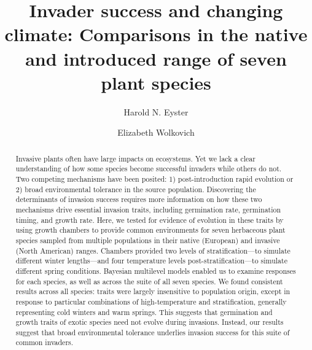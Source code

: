 \documentclass[12pt]{article}\usepackage[]{graphicx}\usepackage[]{color}
\title{Invader success and changing climate: Comparisons in the native and introduced range of seven plant species}
\author[1]{Harold N. Eyster}
\author[2]{Elizabeth Wolkovich}
\affil[1]{Institute for Resources, Environment, and Sustainability, University of British Columbia}
\affil[2]{Department of Forest and Conservation Science, University of British Columbia}
\date{}                     %
\begin{document}
\maketitle

\begin{spacing}{1} %
	\begin{abstract} 
Invasive plants often have large impacts on ecosystems. Yet we lack a clear understanding of how some species become successful invaders while others do not. Two competing mechanisms have been posited: 1) post-introduction rapid evolution or 2) broad environmental tolerance in the source population. 
Discovering the determinants of invasion success requires more information on how these two mechanisms drive essential invasion traits, including germination rate, germination timing, and growth rate. 
Here, we tested for evidence of evolution in these traits by using growth chambers to provide common environments for seven herbaceous plant species sampled from multiple populations in their native (European) and invasive (North American) ranges. Chambers provided two levels of stratification---to simulate different winter lengths---and four temperature levels post-stratification---to simulate different spring conditions. Bayesian multilevel models enabled us to examine responses for each species, as well as across the suite of all seven species.
We found consistent results across all species: traits were largely insensitive to population origin, except in response to particular combinations of high-temperature and stratification, generally representing cold winters and warm springs. This suggests that germination and growth traits of exotic species need not evolve during invasions. Instead, our results suggest that broad environmental tolerance underlies invasion success for this suite of common invaders. 
	\end{abstract}
\end{spacing}		
\end{document}
